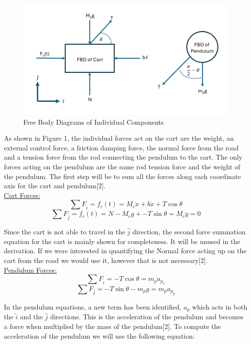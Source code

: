 \documentclass[titlepage]{article}
\begin{document}
\begin{figure}[H]
\center
\includegraphics[width=1\linewidth]{free_body_diagram.png}
\caption{Free Body Diagrams of Individual Components}
\end{figure}

As shown in Figure 1, the individual forces act on the cart are the weight, an external control force, a friction damping force, the normal force from the road and a tension force from the rod connecting the pendulum to the cart. The only forces acting on the pendulum are the same rod tension force and the weight of the pendulum. The first step will be to sum all the forces along each coordinate axis for the cart and pendulum[2].\\

\underline{Cart Forces:}
\begin{equation}
\sum{}{F_{\hat{i}}} = f_{c}\left(t\right) = M_{c}\ddot{x} + b\dot{x} + T\cos{\theta}
\end{equation}
\[ \sum{}{F_{\hat{j}}} = f_{c}\left(t\right) = N - M_{c}g + - T\sin{\theta} = M_{c}\ddot{y}=0 \]

Since the cart is not able to travel in the \(\hat{j}\) direction, the second force summation equation for the cart is mainly shown for completeness. It will be unused in the derivation. If we were interested in quantifying the Normal force acting up on the cart from the road we would use it, however that is not necessary[2].\\

\underline{Pendulum Forces:}
\[ \sum{}{F_{\hat{i}}} = -T\cos{\theta} = m_{p}a_{p_{x}}\]
\[ \sum{}{F_{\hat{j}}} =  -T\sin{\theta} -m_{p}g = m_{p}a_{p_{y}} \]

In the pendulum equations, a new term has been identified, \(a_{p}\) which acts in both the \(\hat{i}\) and the \(\hat{j}\) directions. This is the acceleration of the pendulum and becomes a force when multiplied by the mass of the pendulum[2]. To compute the acceleration of the pendulum we will use the following equation:
\end{document}
